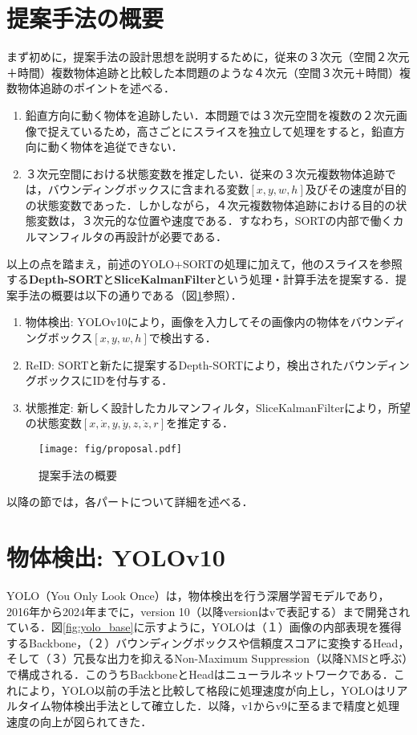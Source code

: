 \section{提案手法の概要}
まず初めに，提案手法の設計思想を説明するために，従来の３次元（空間２次元＋時間）複数物体追跡と比較した本問題のような４次元（空間３次元＋時間）複数物体追跡のポイントを述べる．
\begin{enumerate}
    \item 鉛直方向に動く物体を追跡したい．本問題では３次元空間を複数の２次元画像で捉えているため，高さごとにスライスを独立して処理をすると，鉛直方向に動く物体を追従できない．
    \item ３次元空間における状態変数を推定したい．従来の３次元複数物体追跡では，バウンディングボックスに含まれる変数$[x,y,w,h]$及びその速度が目的の状態変数であった．しかしながら，４次元複数物体追跡における目的の状態変数は，３次元的な位置や速度である．すなわち，SORTの内部で働くカルマンフィルタの再設計が必要である．
\end{enumerate}

以上の点を踏まえ，前述のYOLO+SORTの処理に加えて，他のスライスを参照する\textbf{Depth-SORT}と\textbf{SliceKalmanFilter}という処理・計算手法を提案する．提案手法の概要は以下の通りである（図\ref{fig:proposal}参照）．

\begin{enumerate}
    \item 物体検出: YOLOv10により，画像を入力してその画像内の物体をバウンディングボックス$[x,y,w,h]$で検出する．
    \item ReID: SORTと新たに提案するDepth-SORTにより，検出されたバウンディングボックスにIDを付与する．
    \item 状態推定: 新しく設計したカルマンフィルタ，SliceKalmanFilterにより，所望の状態変数$[x,\dot{x},y,\dot{y},z,\dot{z},r]$を推定する．
\end{enumerate}

\begin{figure}[t]
    \centering
    \texttt{[image: fig/proposal.pdf]}
    \caption{提案手法の概要}
    \label{fig:proposal}
\end{figure}

以降の節では，各パートについて詳細を述べる．

\section{物体検出: YOLOv10}
YOLO（You Only Look Once）は，物体検出を行う深層学習モデルであり，2016年から2024年までに，version 10（以降versionはvで表記する）まで開発されている．図\ref{fig:yolo_base}に示すように，YOLOは（１）画像の内部表現を獲得するBackbone，（２）バウンディングボックスや信頼度スコアに変換するHead，そして（３）冗長な出力を抑えるNon-Maximum Suppression（以降NMSと呼ぶ）で構成される．このうちBackboneとHeadはニューラルネットワークである．これにより，YOLO以前の手法と比較して格段に処理速度が向上し，YOLOはリアルタイム物体検出手法として確立した．以降，v1からv9に至るまで精度と処理速度の向上が図られてきた．

